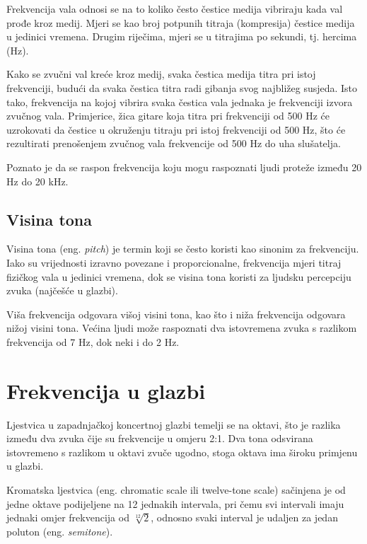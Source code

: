 \documentclass[times, utf8, zavrsni, numeric]{fer}
\begin{document}
Frekvencija vala odnosi se na to koliko često čestice medija vibriraju kada val prođe kroz medij. Mjeri se kao broj potpunih titraja (kompresija) čestice medija u jedinici vremena. Drugim riječima, mjeri se u titrajima po sekundi, tj. hercima (Hz).

Kako se zvučni val kreće kroz medij, svaka čestica medija titra pri istoj frekvenciji, budući da svaka čestica titra radi gibanja svog najbližeg susjeda. Isto tako, frekvencija na kojoj vibrira svaka čestica vala jednaka je frekvenciji izvora zvučnog vala. Primjerice, žica gitare koja titra pri frekvenciji od 500 Hz će uzrokovati da čestice u okruženju titraju pri istoj frekvenciji od 500 Hz, što će rezultirati prenošenjem zvučnog vala frekvencije od 500 Hz do uha slušatelja.

Poznato je da se raspon frekvencija koju mogu raspoznati ljudi proteže između 20 Hz do 20 kHz.

\section{Visina tona}
Visina tona (eng. \textit{pitch}) je termin koji se često koristi kao sinonim za frekvenciju. Iako su vrijednosti izravno povezane i proporcionalne, frekvencija mjeri titraj fizičkog vala u jedinici vremena, dok se visina tona koristi za ljudsku percepciju zvuka (najčešće u glazbi).\cite{stevens1940relation}

Viša frekvencija odgovara višoj visini tona, kao što i niža frekvencija odgovara nižoj visini tona. Većina ljudi može raspoznati dva istovremena zvuka s razlikom frekvencija od 7 Hz, dok neki i do 2 Hz.

%

\chapter{Frekvencija u glazbi}
Ljestvica u zapadnjačkoj koncertnoj glazbi temelji se na oktavi, što je razlika između dva zvuka čije su frekvencije u omjeru 2:1. Dva tona odsvirana istovremeno s razlikom u oktavi zvuče ugodno, stoga oktava ima široku primjenu u glazbi. 

Kromatska ljestvica (eng. chromatic scale ili twelve-tone scale) sačinjena je od jedne oktave podijeljene na 12 jednakih intervala, pri čemu svi intervali imaju jednaki omjer frekvencija od $\sqrt[12]{2}$, odnosno svaki interval je udaljen za jedan poluton (eng. \textit{semitone}).\cite{sundberg1982tune}
\end{document}
